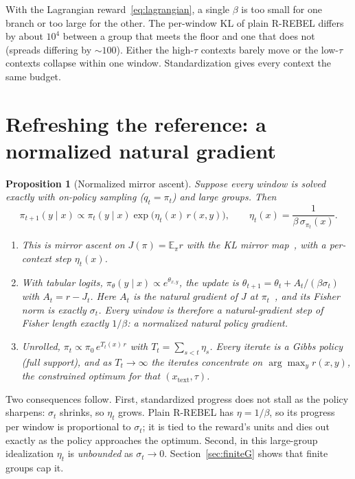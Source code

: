 \documentclass[11pt]{article}
\newtheorem{proposition}[theorem]{Proposition}
\theoremstyle{definition}
\theoremstyle{remark}
\newcommand{\E}{\mathbb{E}}
\newcommand{\1}{\mathbb{1}}
\newcommand{\rr}{R-REBEL}
\begin{document}
With the Lagrangian reward~\eqref{eq:lagrangian}, a single $\beta$ is too small
for one branch or too large for the other. The per-window KL of plain \rr{} differs
by about $10^4$ between a group that meets the floor and one that does not
(spreads differing by $\sim\!100$). Either the high-$\tau$ contexts barely move or
the low-$\tau$ contexts collapse within one window. Standardization gives every
context the same budget.

\section{Refreshing the reference: a normalized natural gradient}\label{sec:npg}

\begin{proposition}[Normalized mirror ascent]\label{prop:npg}
Suppose every window is solved exactly with on-policy sampling ($q_t=\pi_t$) and
large groups. Then
\begin{equation}\label{eq:md}
  \pi_{t+1}(y\mid x)\propto\pi_t(y\mid x)\exp\bigl(\eta_t(x)\,r(x,y)\bigr),
  \qquad \eta_t(x)=\frac{1}{\beta\,\sigma_{\pi_t}(x)} .
\end{equation}
\begin{enumerate}[label=(\roman*),itemsep=1pt,topsep=2pt]
\item This is mirror ascent on $J(\pi)=\E_\pi r$ with the KL mirror map~\cite{beck}, with a
per-context step $\eta_t(x)$.
\item With tabular logits, $\pi_\theta(y\mid x)\propto e^{\theta_{x,y}}$, the update is
$\theta_{t+1}=\theta_t+A_t/(\beta\sigma_t)$ with $A_t=r-J_t$. Here $A_t$ is the
natural gradient of $J$ at $\pi_t$~\cite{kakade}, and its Fisher norm is exactly
$\sigma_t$. Every window is therefore a natural-gradient step of Fisher length
exactly $1/\beta$: a \emph{normalized} natural policy gradient.
\item Unrolled, $\pi_t\propto\pi_0\,e^{T_t(x)\,r}$ with $T_t=\sum_{s<t}\eta_s$. Every
iterate is a Gibbs policy (full support), and as $T_t\to\infty$ the iterates
concentrate on $\arg\max_y r(x,y)$, the constrained optimum for that $(x_{\mathrm{text}},\tau)$.
\end{enumerate}
\end{proposition}

Two consequences follow. First, standardized progress does not stall as the policy
sharpens: $\sigma_t$ shrinks, so $\eta_t$ grows. Plain \rr{} has $\eta=1/\beta$, so its
progress per window is proportional to $\sigma_t$; it is tied to the reward's units
and dies out exactly as the policy approaches the optimum. Second, in this
large-group idealization $\eta_t$ is \emph{unbounded} as $\sigma_t\to0$.
Section~\ref{sec:finiteG} shows that finite groups cap it.
\end{document}
